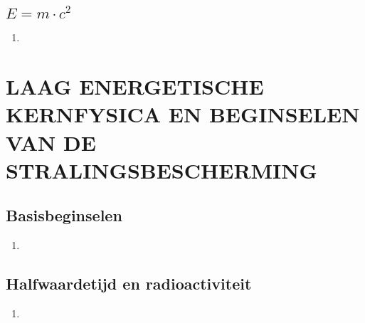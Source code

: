 \documentclass[12pt]{article}
\begin{document}
    \subsection{$E=m \cdot c^2$}
    \begin{enumerate}
        \item 
    \end{enumerate}



    \section{LAAG ENERGETISCHE KERNFYSICA EN BEGINSELEN VAN DE STRALINGSBESCHERMING}
    \subsection{Basisbeginselen}
    \begin{enumerate}
        \item 
    \end{enumerate}
    \subsection{Halfwaardetijd en radioactiviteit}
    \begin{enumerate}
        \item 
    \end{enumerate}
\end{document}
